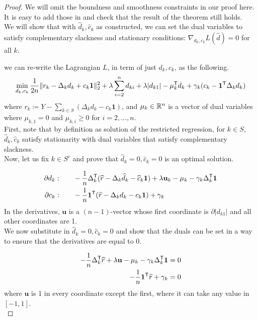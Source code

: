 \documentclass{article}
\begin{document}
\begin{proof}
We will omit the boundness and smoothness constraints in our proof here. It is easy to add those in and check that the result of the theorem still holds.\\

We will show that with $\hat{d}_k, \hat{c}_k$ as constructed, we can set the dual variables to satisfy complementary slackness and stationary conditions: $\nabla_{d_k, c_k} L(\hat{d})  = 0$ for all $k$.

we can re-write the Lagrangian $L$, in term of just $d_k,c_k$, as the following.
\[
\min_{d_k, c_k}  \frac{1}{2n} \| r_k - \Delta_k d_k + c_k \mathbf{1} \|_2^2 + \lambda \sum_{i=2}^n d_{ki} + \lambda|d_{k1}| - \mu_k^{\mathsf{T}} d_k + \gamma_k (c_k - \mathbf{1}^{\mathsf{T}}\Delta_k d_k)
\]
where $r_k \coloneqq Y - \sum_{k \in S} (\Delta_k d_k - c_k \mathbf{1})$, and $\mu_k \in \mathbb{R}^n$ is a vector of dual variables where $\mu_{k,1} = 0$ and $\mu_{k,i} \geq 0$ for $i=2,...,n$.\\

First, note that by definition as solution of the restricted regression, for $k \in S$, $\hat{d}_k, \hat{c}_k$ satisfy stationarity with dual variables that satisfy complementary slackness. \\

Now, let us fix $k \in S^c$ and prove that $\hat{d}_k = 0, \hat{c}_k=0$ is an optimal solution. 

\begin{align*}
\partial d_k :& \qquad -\frac{1}{n} \Delta_k^{\mathsf{T}} ( \widehat{r} - \Delta_k \widehat{d}_k - \widehat{c}_k \mathbf{1}) + \lambda \mathbf{u}_k  - \mu_k - \gamma_k \Delta_k^{\mathsf{T}} \mathbf{1} \\
\partial c_k: & \qquad -\frac{1}{n} \mathbf{1}^{\mathsf{T}} ( \widehat{r} - \Delta_k d_k - c_k \mathbf{1}) + \gamma_k
\end{align*}
In the derivatives, $\mathbf{u}$ is a $(n-1)$-vector whose first coordinate is $\partial | d_{k1}|$ and all other coordinates are 1.\\

We now substitute in $\hat{d}_k = 0, \hat{c}_k=0$ and show that the duals can be set in a way to ensure that the derivatives are equal to 0.

\begin{align*}
-\frac{1}{n} \Delta_k^{\mathsf{T}}\widehat{r} + \lambda \mathbf{u} - \mu_k - \gamma_k \Delta_k^{\mathsf{T}} \mathbf{1} &= 0 \\
-\frac{1}{n} \mathbf{1}^{\mathsf{T}} \widehat{r} + \gamma_k & = 0 \\
\end{align*}
where $\mathbf{u}$ is 1 in every coordinate except the first, where it can take any value in $[-1,1]$.\\


\end{proof}
\end{document}
